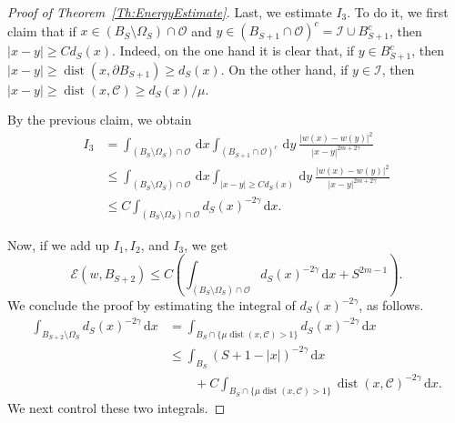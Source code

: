 \documentclass[12pt,reqno]{amsart}
\theoremstyle{definition}
\theoremstyle{remark}
\newcommand{\ccal}{\mathscr{C}}
\newcommand{\ecal}{\mathcal{E}}
\newcommand{\ical}{\mathcal{I}}
\newcommand{\ocal}{\mathcal{O}}
\newcommand{\s}{\gamma}
\renewcommand{\d}{\,\mathrm{d}} %
\DeclareMathOperator{\dist}{dist}
\numberwithin{equation}{section}
\begin{document}
\begin{proof}[Proof of Theorem~\ref{Th:EnergyEstimate}]
	Last, we estimate $I_3$. To do it, we first claim that if $x\in (B_S\setminus \Omega_S) \cap \ocal$ and $y\in (B_{S+1}\cap \ocal)^c = \ical \cup B_{S+1}^c$, then $|x-y|\geq C d_S(x)$. Indeed, on the one hand it is clear that, if $y\in B_{S+1}^c$, then $|x-y|\geq \dist(x,\partial B_{S+1})\geq d_S(x)$. On the other hand, if $y\in \ical$, then $|x-y|\geq \dist(x,\ccal) \geq  d_S(x) / \mu$.
	
	By the previous claim, we obtain
	\begin{align*}
	I_3 &= \int_{(B_S\setminus \Omega_S)\cap \ocal} \d x \int_{(B_{S+1}\cap \ocal)^c} \d y \  \frac{|w(x)-w(y)|^2}{|x-y|^{2m+2\s}} \\
	&\leq \int_{(B_S\setminus \Omega_S)\cap \ocal} \d x \int_{|x-y|\geq C d_S(x)} \d y \ \frac{|w(x)-w(y)|^2}{|x-y|^{2m+2\s}} \\
	&\leq C \int_{(B_S\setminus \Omega_S)\cap \ocal}  d_S(x)^{-2\s} \d x .
	\end{align*}
	
	Now, if we add up $I_1, I_2$, and $I_3$, we get
	\begin{equation}
	\label{Eq:EnergyEstimateProofLastEstimate}
	\ecal(w,B_{S+2}) \leq C \left( \int_{(B_S\setminus \Omega_S)\cap \ocal}  d_S(x)^{-2\s} \d x + S^{2m-1}\right).
	\end{equation}
	We conclude the proof by estimating the integral of $d_S(x)^{-2\s}$, as follows.
	\begin{align*}
	\int_{B_{S+2}\setminus \Omega_S} d_S(x)^{-2\s} \d x &= \int_{B_{S}\cap \{\mu \dist(x,\ccal)>1\}} d_S(x)^{-2\s} \d x \\
	& \leq \int_{B_S} \left( S+1-|x| \right)^{-2\s} \d x \\
	& \quad \quad + C \int_{B_{S}\cap \{\mu \dist(x,\ccal)>1\}} \dist(x,\ccal)^{-2\s} \d x.
	\end{align*}
	We next control these two integrals.
	

\end{proof}
\end{document}
